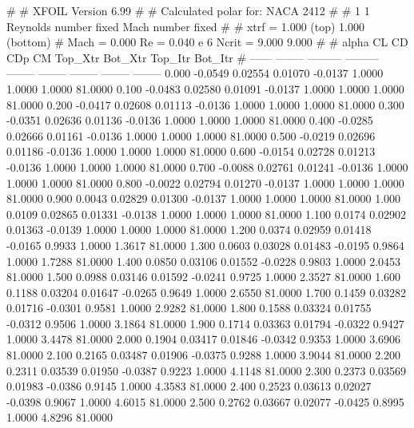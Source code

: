 #  
#       XFOIL         Version 6.99
#  
# Calculated polar for: NACA 2412                                       
#  
# 1 1 Reynolds number fixed          Mach number fixed         
#  
# xtrf =   1.000 (top)        1.000 (bottom)  
# Mach =   0.000     Re =     0.040 e 6     Ncrit =   9.000  9.000
#  
#   alpha    CL        CD       CDp       CM     Top_Xtr  Bot_Xtr  Top_Itr  Bot_Itr
#  ------ -------- --------- --------- -------- -------- -------- -------- --------
   0.000  -0.0549   0.02554   0.01070  -0.0137   1.0000   1.0000   1.0000  81.0000
   0.100  -0.0483   0.02580   0.01091  -0.0137   1.0000   1.0000   1.0000  81.0000
   0.200  -0.0417   0.02608   0.01113  -0.0136   1.0000   1.0000   1.0000  81.0000
   0.300  -0.0351   0.02636   0.01136  -0.0136   1.0000   1.0000   1.0000  81.0000
   0.400  -0.0285   0.02666   0.01161  -0.0136   1.0000   1.0000   1.0000  81.0000
   0.500  -0.0219   0.02696   0.01186  -0.0136   1.0000   1.0000   1.0000  81.0000
   0.600  -0.0154   0.02728   0.01213  -0.0136   1.0000   1.0000   1.0000  81.0000
   0.700  -0.0088   0.02761   0.01241  -0.0136   1.0000   1.0000   1.0000  81.0000
   0.800  -0.0022   0.02794   0.01270  -0.0137   1.0000   1.0000   1.0000  81.0000
   0.900   0.0043   0.02829   0.01300  -0.0137   1.0000   1.0000   1.0000  81.0000
   1.000   0.0109   0.02865   0.01331  -0.0138   1.0000   1.0000   1.0000  81.0000
   1.100   0.0174   0.02902   0.01363  -0.0139   1.0000   1.0000   1.0000  81.0000
   1.200   0.0374   0.02959   0.01418  -0.0165   0.9933   1.0000   1.3617  81.0000
   1.300   0.0603   0.03028   0.01483  -0.0195   0.9864   1.0000   1.7288  81.0000
   1.400   0.0850   0.03106   0.01552  -0.0228   0.9803   1.0000   2.0453  81.0000
   1.500   0.0988   0.03146   0.01592  -0.0241   0.9725   1.0000   2.3527  81.0000
   1.600   0.1188   0.03204   0.01647  -0.0265   0.9649   1.0000   2.6550  81.0000
   1.700   0.1459   0.03282   0.01716  -0.0301   0.9581   1.0000   2.9282  81.0000
   1.800   0.1588   0.03324   0.01755  -0.0312   0.9506   1.0000   3.1864  81.0000
   1.900   0.1714   0.03363   0.01794  -0.0322   0.9427   1.0000   3.4478  81.0000
   2.000   0.1904   0.03417   0.01846  -0.0342   0.9353   1.0000   3.6906  81.0000
   2.100   0.2165   0.03487   0.01906  -0.0375   0.9288   1.0000   3.9044  81.0000
   2.200   0.2311   0.03539   0.01950  -0.0387   0.9223   1.0000   4.1148  81.0000
   2.300   0.2373   0.03569   0.01983  -0.0386   0.9145   1.0000   4.3583  81.0000
   2.400   0.2523   0.03613   0.02027  -0.0398   0.9067   1.0000   4.6015  81.0000
   2.500   0.2762   0.03667   0.02077  -0.0425   0.8995   1.0000   4.8296  81.0000
